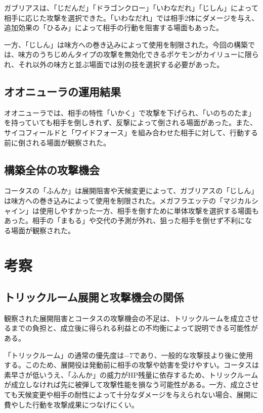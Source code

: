 \documentclass[a4paper,10pt]{ltjsarticle}
\begin{document}
ガブリアスは、「じだんだ」「ドラゴンクロー」「いわなだれ」「じしん」によって相手に応じた攻撃を選択できた。「いわなだれ」では相手2体にダメージを与え、追加効果の「ひるみ」によって相手の行動を阻害する場面もあった。

一方、「じしん」は味方への巻き込みによって使用を制限された。今回の構築では、味方のうちじめんタイプの攻撃を無効化できるポケモンがカイリューに限られ、それ以外の味方と並ぶ場面では別の技を選択する必要があった。

\subsection{オオニューラの運用結果}

オオニューラでは、相手の特性「いかく」で攻撃を下げられ、「いのちのたま」を持っていても相手を倒しきれず、反撃によって倒される場面があった。また、サイコフィールドと「ワイドフォース」を組み合わせた相手に対して、行動する前に倒される場面が観察された。

\subsection{構築全体の攻撃機会}

コータスの「ふんか」は展開阻害や天候変更によって、ガブリアスの「じしん」は味方への巻き込みによって使用を制限された。メガフラエッテの「マジカルシャイン」は使用しやすかった一方、相手を倒すために単体攻撃を選択する場面もあった。相手の「まもる」や交代の予測が外れ、狙った相手を倒せず不利になる場面が観察された。

\section{考察}
\subsection{トリックルーム展開と攻撃機会の関係}

観察された展開阻害とコータスの攻撃機会の不足は、トリックルームを成立させるまでの負担と、成立後に得られる利益との不均衡によって説明できる可能性がある。

「トリックルーム」の通常の優先度は$-7$であり、一般的な攻撃技より後に使用する。このため、展開役は発動前に相手の攻撃や妨害を受けやすい。コータスは素早さが低いうえ、「ふんか」の威力がHP残量に依存するため、トリックルームが成立しなければ先に被弾して攻撃性能を損なう可能性がある。一方、成立させても天候変更や相手の耐性によって十分なダメージを与えられない場合、展開に費やした行動を攻撃成果につなげにくい。
\end{document}
